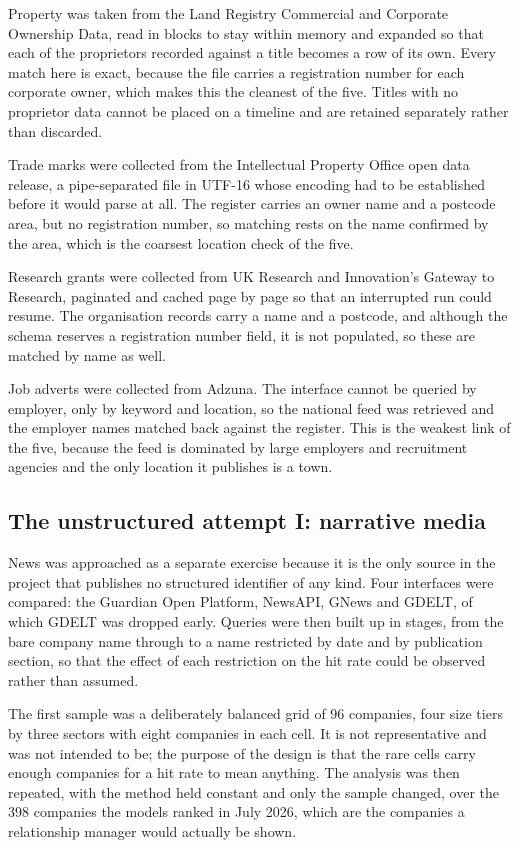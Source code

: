 \documentclass[    author={Samuel Menon Demelo; Sneha Saphala Ram Prasad; 
Viktor Ander Lindholm; Vishal Khatri},
               supervisor={Prof. Fernando Moreno-Pino},
                   degree={MSc},
                    title={Lloyds Commercial Banking Intelligence},
                 subtitle={Ranking SME Lending, Risk and Growth Prospects for Lloyds Banking Group},
                     type={},
                     year={2026}]{dissertation}
\begin{document}
Property was taken from the Land Registry Commercial and Corporate Ownership Data, read in blocks to stay within memory and expanded so that each of the proprietors recorded against a title becomes a row of its own. Every match here is exact, because the file carries a registration number for each corporate owner, which makes this the cleanest of the five. Titles with no proprietor data cannot be placed on a timeline and are retained separately rather than discarded.

Trade marks were collected from the Intellectual Property Office open data release, a pipe-separated file in UTF-16 whose encoding had to be established before it would parse at all. The register carries an owner name and a postcode area, but no registration number, so matching rests on the name confirmed by the area, which is the coarsest location check of the five.

Research grants were collected from UK Research and Innovation's Gateway to Research, paginated and cached page by page so that an interrupted run could resume. The organisation records carry a name and a postcode, and although the schema reserves a registration number field, it is not populated, so these are matched by name as well.

Job adverts were collected from Adzuna. The interface cannot be queried by employer, only by keyword and location, so the national feed was retrieved and the employer names matched back against the register. This is the weakest link of the five, because the feed is dominated by large employers and recruitment agencies and the only location it publishes is a town.

\subsection{The unstructured attempt I: narrative media}
News was approached as a separate exercise because it is the only source in the project that publishes no structured identifier of any kind. Four interfaces were compared: the Guardian Open Platform, NewsAPI, GNews and GDELT, of which GDELT was dropped early. Queries were then built up in stages, from the bare company name through to a name restricted by date and by publication section, so that the effect of each restriction on the hit rate could be observed rather than assumed.

The first sample was a deliberately balanced grid of 96 companies, four size tiers by three sectors with eight companies in each cell. It is not representative and was not intended to be; the purpose of the design is that the rare cells carry enough companies for a hit rate to mean anything. The analysis was then repeated, with the method held constant and only the sample changed, over the 398 companies the models ranked in July 2026, which are the companies a relationship manager would actually be shown.
\end{document}
